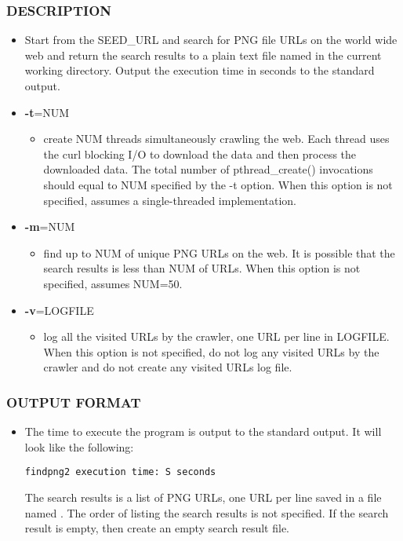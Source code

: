 \subsubsection*{DESCRIPTION}
\begin{itemize}
\item[]Start from the SEED\_URL and search for PNG file URLs on the world wide web and return the search results to a plain text file named  in the current working directory. Output the execution time in seconds to the standard output.
\item[] {\bf -t}=NUM
  \begin{itemize}
  \item[] create NUM threads simultaneously crawling the web. Each thread uses the curl blocking I/O to download the data and then process the downloaded data. The total number of pthread\_create() invocations should equal to NUM specified by the -t option. When this option is not specified, assumes a single-threaded implementation.
  \end{itemize}
\item[] {\bf -m}=NUM
  \begin{itemize}
  \item[] find up to NUM of unique PNG URLs on the web. It is possible that the search results is less than NUM of URLs. When this option is not specified, assumes NUM=50. 
  \end{itemize}
\item[] {\bf -v}=LOGFILE
  \begin{itemize}
  \item[] log all the visited URLs by the crawler, one URL per line in LOGFILE. When this option is not specified, do not log any visited URLs by the crawler and do not create any visited URLs log file.
  \end{itemize}
\end{itemize}
\subsubsection*{OUTPUT FORMAT}
\begin{itemize}
\item[]The time to execute the program is output to the standard output. It will look like the following:
\begin{verbatim}
findpng2 execution time: S seconds
\end{verbatim}
  The search results is a list of PNG URLs, one URL per line saved in a file named . The order of listing the search results is not specified. If the search result is empty, then create an empty search result file.
\end{itemize}
